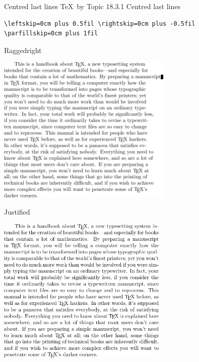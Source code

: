\documentclass[t,10pt]{beamer}
\begin{document}
\begin{frame}[fragile]{Centred last lines}
  \alert{\TeX\ by Topic} 18.3.1 Centred last lines
  \begin{Verbatim}[fontsize=\small]
\leftskip=0cm plus 0.5fil \rightskip=0cm plus -0.5fil
\parfillskip=0cm plus 1fil
  \end{Verbatim}
\end{frame}

\begin{frame}[fragile]{Raggedright}
  \begin{center}
    \includegraphics[width=3.3in]{victor_ragg.pdf}
  \end{center}
\end{frame}

\begin{frame}[fragile]{Justified}
  \begin{center}
    \includegraphics[width=3.2in]{victor_org.pdf}
  \end{center}
\end{frame}
\end{document}
